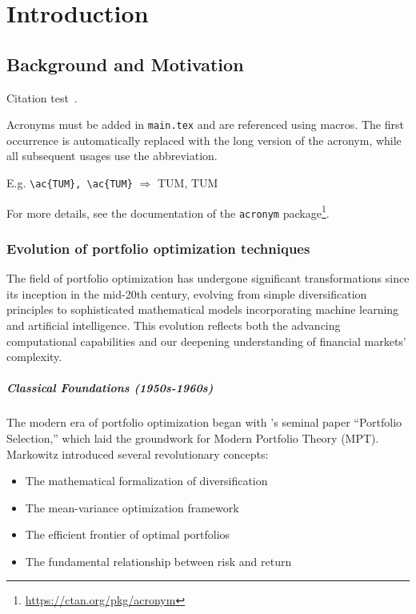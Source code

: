 
\chapter{Introduction}\label{chapter:introduction}

\section{Background and Motivation}
Citation test~\parencite{latex}.

Acronyms must be added in \texttt{main.tex} and are referenced using macros. The first occurrence is automatically replaced with the long version of the acronym, while all subsequent usages use the abbreviation.

E.g. \texttt{\textbackslash ac\{TUM\}, \textbackslash ac\{TUM\}} $\Rightarrow$ \ac{TUM}, \ac{TUM}

For more details, see the documentation of the \texttt{acronym} package\footnote{\url{https://ctan.org/pkg/acronym}}.


\subsection{Evolution of portfolio optimization techniques}
The field of portfolio optimization has undergone significant transformations since its inception in the mid-20th century, evolving from simple diversification principles to sophisticated mathematical models incorporating machine learning and artificial intelligence. 
This evolution reflects both the advancing computational capabilities and our deepening understanding of financial markets' complexity.


\paragraph{Classical Foundations (1950s-1960s)}
The modern era of portfolio optimization began with \parencite{markowitz1952portfolio}'s seminal paper ``Portfolio Selection,'' which laid the groundwork for Modern Portfolio Theory (MPT). Markowitz introduced several revolutionary concepts:

\begin{itemize}
    \item The mathematical formalization of diversification
    \item The mean-variance optimization framework
    \item The efficient frontier of optimal portfolios
    \item The fundamental relationship between risk and return
\end{itemize}

